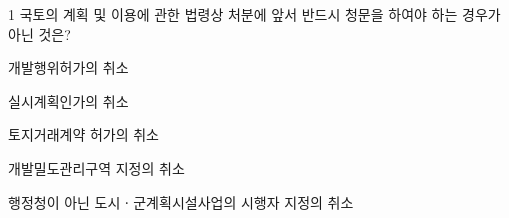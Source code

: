 \begin{question}{1}
국토의 계획 및 이용에 관한 법령상 처분에 앞서 반드시 청문을 하여야 하는 경우가 아닌 것은?
\begin{choices}
  \item 개발행위허가의 취소
  \item 실시계획인가의 취소
  \item 토지거래계약 허가의 취소
  \item 개발밀도관리구역 지정의 취소
  \item 행정청이 아닌 도시ㆍ군계획시설사업의 시행자 지정의 취소
\end{choices}
\end{question}
